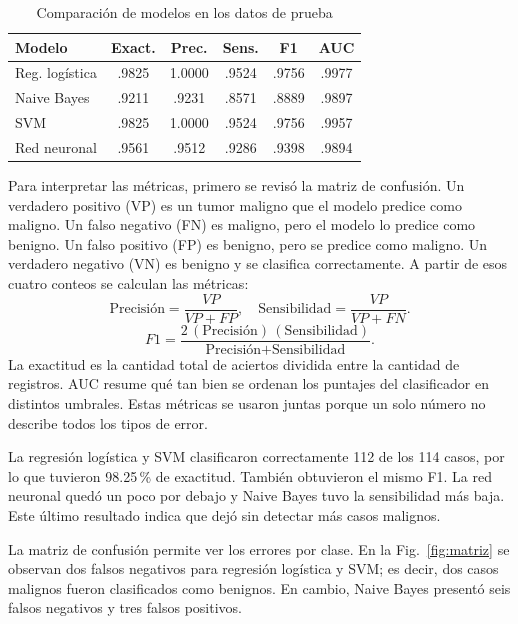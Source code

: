\documentclass[conference]{IEEEtran}
\begin{document}
\begin{table}[!t]
\centering
\caption{Comparación de modelos en los datos de prueba}
\label{tab:test}
\scriptsize
\begin{tabular}{lccccc}
\toprule Modelo & Exact. & Prec. & Sens. & F1 & AUC\\\midrule
Reg. logística & .9825 & 1.0000 & .9524 & .9756 & .9977\\
Naive Bayes & .9211 & .9231 & .8571 & .8889 & .9897\\
SVM & .9825 & 1.0000 & .9524 & .9756 & .9957\\
Red neuronal & .9561 & .9512 & .9286 & .9398 & .9894\\
\bottomrule
\end{tabular}
\end{table}


Para interpretar las métricas, primero se revisó la matriz de confusión. Un verdadero positivo (VP) es un tumor maligno que el modelo predice como maligno. Un falso negativo (FN) es maligno, pero el modelo lo predice como benigno. Un falso positivo (FP) es benigno, pero se predice como maligno. Un verdadero negativo (VN) es benigno y se clasifica correctamente. A partir de esos cuatro conteos se calculan las métricas:
\begin{equation}
\text{Precisión}=\frac{VP}{VP+FP},\quad
\text{Sensibilidad}=\frac{VP}{VP+FN}.
\end{equation}
\begin{equation}
F1=\frac{2\,(\text{Precisión})\,(\text{Sensibilidad})}{\text{Precisión}+\text{Sensibilidad}}.
\end{equation}
La exactitud es la cantidad total de aciertos dividida entre la cantidad de registros. AUC resume qué tan bien se ordenan los puntajes del clasificador en distintos umbrales. Estas métricas se usaron juntas porque un solo número no describe todos los tipos de error.

La regresión logística y SVM clasificaron correctamente 112 de los 114 casos, por lo que tuvieron 98.25\,\% de exactitud. También obtuvieron el mismo F1. La red neuronal quedó un poco por debajo y Naive Bayes tuvo la sensibilidad más baja. Este último resultado indica que dejó sin detectar más casos malignos.

La matriz de confusión permite ver los errores por clase. En la Fig.~\ref{fig:matriz} se observan dos falsos negativos para regresión logística y SVM; es decir, dos casos malignos fueron clasificados como benignos. En cambio, Naive Bayes presentó seis falsos negativos y tres falsos positivos.
\end{document}
